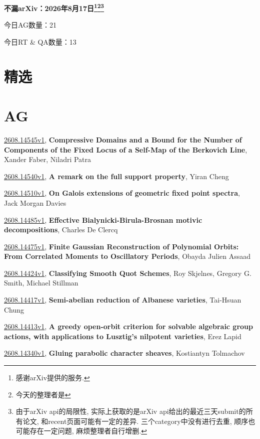 \documentclass[9pt, a4paper]{article}
\theoremstyle{plain}
\theoremstyle{definition}
\theoremstyle{remark}
\newcommand{\arxiv}[3]{\href{https://arxiv.org/abs/#1}{#1}, \textbf{\textcolor{arxivblue}{#2}}, #3}
\newcommand{\AGnumber}{21}
\newcommand{\RTQAnumber}{13}
\newcommand{\NewestDate}{2026年8月17日}
\newcommand{\todayarXiver}{} %
\begin{document}
\begin{center}
    \Huge\textbf{不漏arXiv：\NewestDate\footnote{感谢arXiv提供的服务.}\footnote{今天的整理者是\todayarXiver}\footnote{由于arXiv api的局限性, 实际上获取的是arXiv api给出的最近三天submit的所有论文, 和recent页面可能有一定的差异. 三个category中没有进行去重, 顺序也可能存在一定问题, 麻烦整理者自行增删.}} \\
\end{center}

\setcounter{section}{-1}

\begin{center}
    今日AG数量：\AGnumber
    
    今日RT \& QA数量：\RTQAnumber
    
\end{center}


\section{精选}


\section{AG}
\arxiv{2608.14545v1}{Compressive Domains and a Bound for the Number of Components of the Fixed Locus of a Self-Map of the Berkovich Line}{Xander Faber, Niladri Patra}

\arxiv{2608.14540v1}{A remark on the full support property}{Yiran Cheng}

\arxiv{2608.14510v1}{On Galois extensions of geometric fixed point spectra}{Jack Morgan Davies}

\arxiv{2608.14485v1}{Effective Bialynicki-Birula-Brosnan motivic decompositions}{Charles De Clercq}

\arxiv{2608.14475v1}{Finite Gaussian Reconstruction of Polynomial Orbits: From Correlated Moments to Oscillatory Periods}{Obayda Julien Assaad}

\arxiv{2608.14424v1}{Classifying Smooth Quot Schemes}{Roy Skjelnes, Gregory G. Smith, Michael Stillman}

\arxiv{2608.14417v1}{Semi-abelian reduction of Albanese varieties}{Tai-Hsuan Chung}

\arxiv{2608.14413v1}{A greedy open-orbit criterion for solvable algebraic group actions, with applications to Lusztig's nilpotent varieties}{Erez Lapid}

\arxiv{2608.14340v1}{Gluing parabolic character sheaves}{Kostiantyn Tolmachov}
\end{document}
